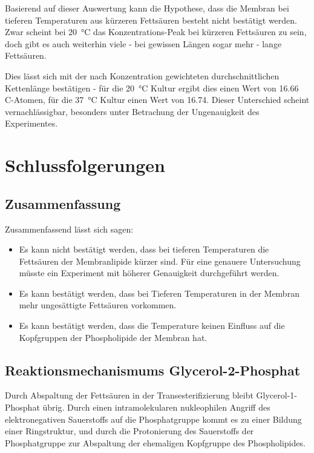 \documentclass[a4paper,english]{scrreprt}
\begin{document}
Basierend auf dieser Auswertung kann die Hypothese, dass die Membran bei
tieferen Temperaturen aus kürzeren Fettsäuren besteht nicht bestätigt werden.
Zwar scheint bei \SI{20}{\celsius} das Konzentrations-Peak bei kürzeren
Fettsäuren zu sein, doch gibt es auch weiterhin viele - bei gewissen Längen
sogar mehr - lange Fettsäuren.

Dies lässt sich mit der nach Konzentration gewichteten durchschnittlichen
Kettenlänge bestätigen - für die \SI{20}{\celsius} Kultur ergibt dies einen
Wert von 16.66 C-Atomen, für die \SI{37}{\celsius} Kultur einen Wert von 16.74.
Dieser Unterschied scheint vernachlässigbar, besonders unter Betrachung der
Ungenauigkeit des Experimentes.

\chapter{Schlussfolgerungen}

\section{Zusammenfassung}

Zusammenfassend lässt sich sagen:

\begin{itemize}
	\item Es kann nicht bestätigt werden, dass bei tieferen Temperaturen
		die Fettsäuren der Membranlipide kürzer sind. Für eine genauere
		Untersuchung müsste ein Experiment mit höherer Genauigkeit
		durchgeführt werden.
	\item Es kann bestätigt werden, dass bei Tieferen Temperaturen in der
		Membran mehr ungesättigte Fettsäuren vorkommen.
	\item Es kann bestätigt werden, dass die Temperature keinen Einfluss
		auf die Kopfgruppen der Phospholipide der Membran hat.
\end{itemize}

\section{Reaktionsmechanismums Glycerol-2-Phosphat}

Durch Abspaltung der Fettsäuren in der Transesterifizierung bleibt
Glycerol-1-Phosphat übrig. Durch einen intramolekularen nukleophilen Angriff
des elektronegativen Sauerstoffs auf die Phosphatgruppe kommt es zu einer
Bildung einer Ringstruktur, und durch die Protonierung des Sauerstoffs der
Phosphatgruppe zur Abspaltung der ehemaligen Kopfgruppe des Phospholipides.
\end{document}
